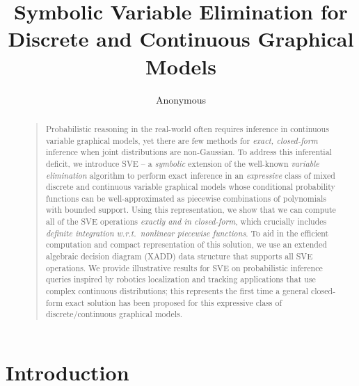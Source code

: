 \documentclass[letterpaper]{article}
\begin{document}
\title{Symbolic Variable Elimination for Discrete and Continuous Graphical Models}\author{Anonymous}

\maketitle
\begin{abstract}
\begin{quote}
Probabilistic reasoning in the real-world often requires inference in
continuous variable graphical models, yet there are few methods for
\emph{exact, closed-form} inference when joint distributions are
non-Gaussian.  To address this inferential deficit, we introduce SVE
-- a \emph{symbolic} extension of the well-known \emph{variable
elimination} algorithm to perform exact inference in an
\emph{expressive} class of mixed discrete and continuous variable
graphical models whose conditional probability functions can be
well-approximated as piecewise combinations of polynomials with
bounded support.  Using this representation, we show that we can
compute all of the SVE operations \emph{exactly and in closed-form},
which crucially includes \emph{definite integration w.r.t.\ nonlinear
piecewise functions}.  To aid in the efficient computation
and compact representation of this solution, we use an extended
algebraic decision diagram (XADD) data structure that supports all SVE
operations.  We provide illustrative results for SVE on probabilistic
inference queries inspired by robotics localization and tracking
applications that use complex continuous distributions; this
represents the first time a general closed-form exact solution
has been proposed for this expressive class of discrete/continuous
graphical models.
\end{quote}
\end{abstract}

\section{Introduction}

\label{sec:intro}
\end{document}
